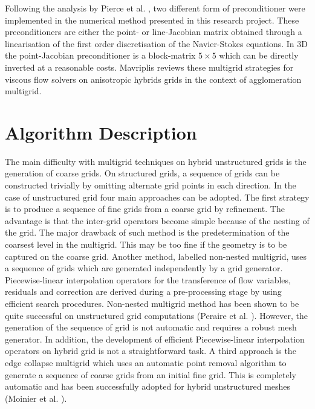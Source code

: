  Following the analysis by Pierce et al. \citeyear{Giles:11},
 two different form of preconditioner were implemented in the
 numerical method presented in this research project.
 These preconditioners are either the point- or line-Jacobian matrix obtained
 through a linearisation of the first order discretisation of the
 Navier-Stokes equations. In 3D the point-Jacobian preconditioner is a
 block-matrix $5\times5$ which can be directly inverted at a reasonable costs.
 Mavriplis \citeyear{Mavriplis:6,Mavriplis:7} reviews these multigrid
 strategies for viscous
 flow solvers on anisotropic hybrids grids in the context of agglomeration
 multigrid.
%
%
%
%
\section{Algorithm Description}
%
 The main difficulty with multigrid techniques on hybrid unstructured grids
 is the generation of coarse grids. On structured grids, a sequence of grids
 can be constructed trivially by omitting alternate grid points in each
 direction. In the case of unstructured grid four main approaches can be
 adopted. The first strategy is to produce a sequence of fine grids
 from a coarse grid by refinement. The advantage is that the inter-grid
 operators become simple because of the nesting of the grid. The major drawback
 of such method is the predetermination of the coarsest level in the multigrid.
 This may be too fine if the geometry is to be captured on the coarse grid.
 Another method, labelled non-nested multigrid, uses a sequence of
 grids which are generated independently by a grid generator.
 Piecewise-linear interpolation operators for the transference of flow
 variables, residuals and correction are derived during a pre-processing stage
 by using efficient search procedures. Non-nested multigrid method
 has been shown to be quite successful on unstructured grid computations
 (Peraire et al. ). However, the generation of the sequence
 of grid is not automatic and requires a robust mesh generator. In addition, the
 development of efficient Piecewise-linear interpolation operators on hybrid
 grid is not a straightforward task.
 A third approach is the edge collapse multigrid which uses
 an automatic point removal algorithm to
 generate a sequence of coarse grids from an initial fine grid. This is
 completely automatic and has been successfully adopted for hybrid unstructured
 meshes (Moinier et al. ).


